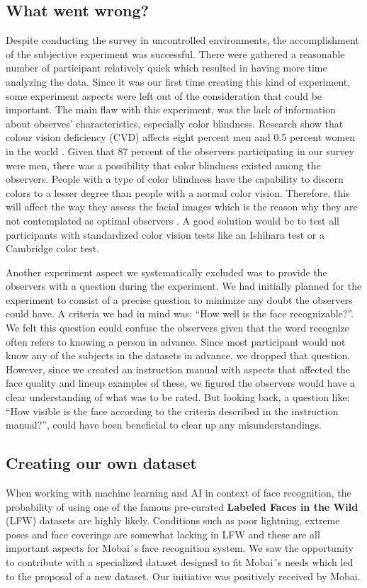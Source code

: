 \subsection{What went wrong?}
Despite conducting the survey in uncontrolled environments, the accomplishment of the subjective experiment was successful. There were gathered a reasonable number of participant relatively quick which resulted in having more time analyzing the data. Since it was our first time creating this kind of experiment, some experiment aspects were left out of the consideration that could be important. The main flaw with this experiment, was the lack of information about observes' characteristics, especially color blindness. Research show that colour vision deficiency (CVD) affects eight percent men and 0.5 percent women in the world \cite{colorblindness}. Given that 87 percent of the observers participating in our survey were men, there was a possibility that color blindness existed among the observers. People with a type of color blindness have the capability to discern colors to a lesser degree than people with a normal color vision. Therefore, this will affect the way they assess the facial images which is the reason why they are not contemplated as optimal observers \cite{Xphdthesis}. A good solution would be to test all participants with standardized color vision tests like an Ishihara test or a Cambridge color test.   

Another experiment aspect we systematically excluded was to provide the observers with a question during the experiment. We had initially planned for the experiment to consist of a precise question to minimize any doubt the observers could have. A criteria we had in mind was: ``How well is the face recognizable?''. We felt this question could confuse the observers given that the word recognize often refers to knowing a person in advance. Since most participant would not know any of the subjects in the datasets in advance, we dropped that question. However, since we created an instruction manual with aspects that affected the face quality and lineup examples of these, we figured the observers would have a clear understanding of what was to be rated. But looking back, a question like: ``How visible is the face according to the criteria described in the instruction manual?'', could have been beneficial to clear up any misunderstandings.   

\subsection{Creating our own dataset}
\label{sec:ownData}
When working with machine learning and AI in context of face recognition, the probability of using one of the famous pre-curated \textbf{Labeled Faces in the Wild} (LFW) datasets are highly likely. Conditions such as poor lightning, extreme poses and face coverings are somewhat lacking in LFW and these are all important aspects for Mobai´s face recognition system. We saw the opportunity to contribute with a specialized dataset designed to fit Mobai´s needs which led to the proposal of a new dataset. Our initiative was positively received by Mobai.

